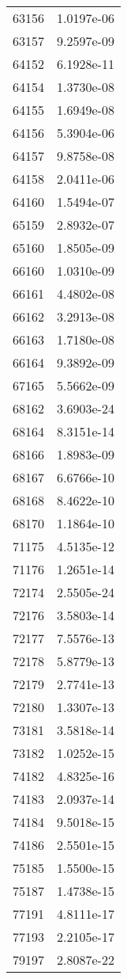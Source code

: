 \begin{table}[h!]
\begin{tabular}{|| c || c |}
63156 & 1.0197e-06 \\
63157 & 9.2597e-09 \\
64152 & 6.1928e-11 \\
64154 & 1.3730e-08 \\
64155 & 1.6949e-08 \\
64156 & 5.3904e-06 \\
64157 & 9.8758e-08 \\
64158 & 2.0411e-06 \\
64160 & 1.5494e-07 \\
65159 & 2.8932e-07 \\
65160 & 1.8505e-09 \\
66160 & 1.0310e-09 \\
66161 & 4.4802e-08 \\
66162 & 3.2913e-08 \\
66163 & 1.7180e-08 \\
66164 & 9.3892e-09 \\
67165 & 5.5662e-09 \\
68162 & 3.6903e-24 \\
68164 & 8.3151e-14 \\
68166 & 1.8983e-09 \\
68167 & 6.6766e-10 \\
68168 & 8.4622e-10 \\
68170 & 1.1864e-10 \\
71175 & 4.5135e-12 \\
71176 & 1.2651e-14 \\
72174 & 2.5505e-24 \\
72176 & 3.5803e-14 \\
72177 & 7.5576e-13 \\
72178 & 5.8779e-13 \\
72179 & 2.7741e-13 \\
72180 & 1.3307e-13 \\
73181 & 3.5818e-14 \\ 
73182 & 1.0252e-15 \\
74182 & 4.8325e-16 \\
74183 & 2.0937e-14 \\
74184 & 9.5018e-15 \\
74186 & 2.5501e-15 \\
75185 & 1.5500e-15 \\
75187 & 1.4738e-15 \\
77191 & 4.8111e-17 \\
77193 & 2.2105e-17 \\
79197 & 2.8087e-22 \\

\end{tabular}
\end{table}
